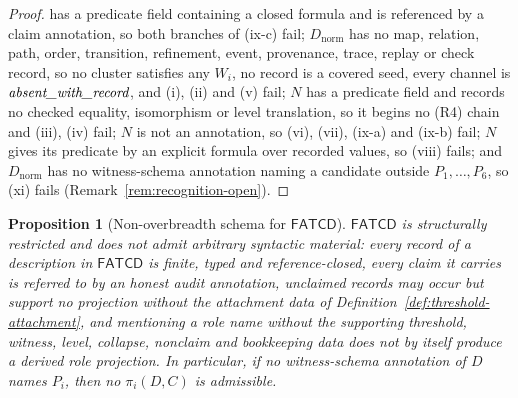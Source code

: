 \documentclass[11pt]{article}
\newtheorem{proposition}[theorem]{Proposition}
\theoremstyle{definition}
\newcommand{\FATCD}{\ensuremath{\mathsf{FATCD}}}
\newcommand{\absentrec}{\textit{absent\_\allowbreak with\_\allowbreak record}}
\begin{document}
\begin{proof}
has a predicate field containing a closed formula and is referenced by a claim annotation, so both branches of (ix-c) fail; \(D_{\mathrm{norm}}\) has no map,
relation, path, order, transition, refinement, event, provenance, trace,
replay or check record, so no cluster satisfies any \(W_i\), no record is a
covered seed, every channel is \(\absentrec\), and (i), (ii) and (v) fail; \(N\)
has a predicate field and records no checked equality, isomorphism or level
translation, so it begins no (R4) chain and (iii), (iv) fail; \(N\) is not an
annotation, so (vi), (vii), (ix-a) and (ix-b) fail; \(N\) gives its predicate
by an explicit formula over recorded values, so (viii) fails; and
\(D_{\mathrm{norm}}\) has no witness-schema annotation naming a candidate
outside \(P_1,\dots,P_6\), so (xi) fails
(Remark~\ref{rem:recognition-open}).
\end{proof}

\begin{proposition}[Non-overbreadth schema for \FATCD{}]\label{prop:non-overbreadth}
\FATCD{} is structurally restricted and does not admit arbitrary
syntactic material: every record of a description in \FATCD{} is finite,
typed and reference-closed, every claim it carries is referred to by an honest
audit annotation,
unclaimed records may occur but support no projection without the attachment
data of Definition~\ref{def:threshold-attachment}, and mentioning a role name without the supporting threshold,
witness, level, collapse, nonclaim and bookkeeping data does not by itself produce a
derived role projection. In particular, if no witness-schema annotation of
\(D\) names \(P_i\), then no \(\pi_i(D,C)\) is admissible.
\end{proposition}
\end{document}

